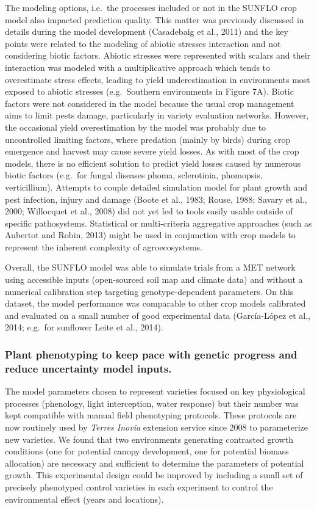 \documentclass[a4paper]{article}
\begin{document}
The modeling options, i.e.~the processes included or not in the SUNFLO
crop model also impacted prediction quality. This matter was previously
discussed in details during the model development (Casadebaig et al.,
2011) and the key points were related to the modeling of abiotic
stresses interaction and not considering biotic factors. Abiotic
stresses were represented with scalars and their interaction was modeled
with a multiplicative approach which tends to overestimate stress
effects, leading to yield underestimation in environments most exposed
to abiotic stresses (e.g.~Southern environments in Figure 7A). Biotic
factors were not considered in the model because the usual crop
management aims to limit pests damage, particularly in variety
evaluation networks. However, the occasional yield overestimation by the
model was probably due to uncontrolled limiting factors, where predation
(mainly by birds) during crop emergence and harvest may cause severe
yield losses. As with most of the crop models, there is no efficient
solution to predict yield losses caused by numerous biotic factors
(e.g.~for fungal diseases phoma, sclerotinia, phomopsis, verticillium).
Attempts to couple detailed simulation model for plant growth and pest
infection, injury and damage (Boote et al., 1983; Rouse, 1988; Savary et
al., 2000; Willocquet et al., 2008) did not yet led to tools easily
usable outside of specific pathosystems. Statistical or multi-criteria
aggregative approaches (such as Aubertot and Robin, 2013) might be used
in conjunction with crop models to represent the inherent complexity of
agroecosystems.

Overall, the SUNFLO model was able to simulate trials from a MET network
using accessible inputs (open-sourced soil map and climate data) and
without a numerical calibration step targeting genotype-dependent
parameters. On this dataset, the model performance was comparable to
other crop models calibrated and evaluated on a small number of good
experimental data (García-López et al., 2014; e.g.~for sunflower Leite
et al., 2014).

\subsubsection{Plant phenotyping to keep pace with genetic progress and
reduce uncertainty model
inputs.}\label{plant-phenotyping-to-keep-pace-with-genetic-progress-and-reduce-uncertainty-model-inputs.}

The model parameters chosen to represent varieties focused on key
physiological processes (phenology, light interception, water response)
but their number was kept compatible with manual field phenotyping
protocols. These protocols are now routinely used by \emph{Terres
Inovia} extension service since 2008 to parameterize new varieties. We
found that two environments generating contrasted growth conditions (one
for potential canopy development, one for potential biomass allocation)
are necessary and sufficient to determine the parameters of potential
growth. This experimental design could be improved by including a small
set of precisely phenotyped control varieties in each experiment to
control the environmental effect (years and locations).
\end{document}
